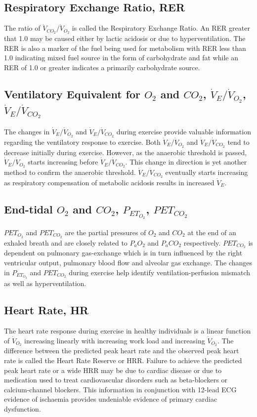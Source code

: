 \subsection[Respiratory Exchange Ratio]{Respiratory Exchange Ratio, RER}
The ratio of $\dot{V}_{CO_2}/\dot{V}_{O_2}$ is called the Respiratory Exchange Ratio. 
An RER greater that 1.0 may be caused either by lactic acidosis or due to hyperventilation. 
The RER is also a marker of the fuel being used for metabolism with RER less than 1.0 indicating mixed fuel source in the form of carbohydrate and fat while an RER of 1.0 or greater indicates a primarily carbohydrate source.

\subsection[Ventilatory Equivalent for O2 and CO2]{Ventilatory Equivalent for $O_2$ and $CO_2$, $\dot{V}_E/\dot{V}_{O_2}$, $\dot{V}_E/\dot{V}_{CO_2}$}
The changes in $\dot{V}_E/\dot{V}_{O_2}$ and $\dot{V}_E/\dot{V}_{CO_2}$ during exercise provide valuable information regarding the ventilatory response to exercise. 
Both $\dot{V}_E/\dot{V}_{O_2}$ and $\dot{V}_E/\dot{V}_{CO_2}$ tend to decrease initially during exercise. 
However, as the anaerobic threshold is passed, $\dot{V}_E/\dot{V}_{O_2}$ starts increasing before $\dot{V}_E/\dot{V}_{CO_2}$. 
This change in direction is yet another method to confirm the anaerobic threshold. $\dot{V}_E/\dot{V}_{CO_2}$ eventually starts increasing as respiratory compensation of metabolic acidosis results in increased $\dot{V}_E$.

\subsection[End-tidal O2, CO2]{End-tidal $O_2$ and $CO_2$, $P_{ET_{O_2}}$, $P{ET_{CO_2}}$}
$PET_{O_2}$ and $PET_{CO_2}$ are the partial pressures of $O_2$ and $CO_2$ at the end of an exhaled breath and are closely related to $P_aO_2$ and $P_aCO_2$ respectively. $P{ET_{CO_2}}$ is dependent on pulmonary gas-exchange which is in turn influenced by the right ventricular output, pulmonary blood flow and alveolar gas exchange. 
The changes in $P_{ET_{O_2}}$ and $P{ET_{CO_2}}$ during exercise help identify ventilation-perfusion mismatch as well as hyperventilation.

\subsection[Heart Rate]{Heart Rate, HR}
\label{sec:heart_rate}
The heart rate response during exercise in healthy individuals is a linear function of $\dot{V}_{O_2}$ increasing linearly with increasing work load and increasing $\dot{V}_{O_2}$. 
The difference between the predicted peak heart rate and the observed peak heart rate is called the Heart Rate Reserve or HRR. 
Failure to achieve the predicted peak heart rate or a wide HRR may be due to cardiac disease or due to medication used to treat cardiovascular disorders such as beta-blockers or calcium-channel blockers. 
This information in conjunction with 12-lead ECG evidence of ischaemia provides undeniable evidence of primary cardiac dysfunction.

